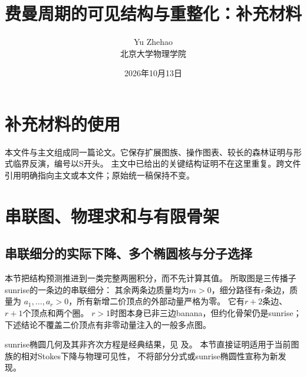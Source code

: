 \documentclass[11pt,a4paper,oneside]{ctexart}
\title{费曼周期的可见结构与重整化：补充材料}
\author{Yu Zhehao\\[4pt]\small 北京大学物理学院}\date{2026年10月13日}
\theoremstyle{cnplain}
\theoremstyle{definition}
\theoremstyle{remark}
\newcommand{\Q}{\mathbb Q}
\newcommand{\im}{\operatorname{im}}
\newcommand{\dR}{\mathrm{dR}}
\numberwithin{equation}{section}
\begin{document}
\maketitle\tableofcontents
\section*{补充材料的使用}
本文件与主文组成同一篇论文。它保存扩展图族、操作图表、较长的森林证明与形式临界反演，编号以S开头。
主文中已给出的关键结构证明不在这里重复。跨文件引用明确指向主文或本文件；原始统一稿保持不变。

\section{串联图、物理求和与有限骨架}\label{supp:unified}

\begingroup
\providecommand{\Q}{\mathbb Q}\providecommand{\cC}{\mathcal C}
\providecommand{\cS}{\mathcal S}\providecommand{\dR}{\mathrm{dR}}
\providecommand{\rk}{\operatorname{rk}}\providecommand{\im}{\operatorname{im}}
\subsection{串联细分的实际下降、多个椭圆核与分子选择}
\label{unified:sec:serieselliptic}
本节把结构预测推进到一类完整两圈积分，而不先计算其值。
所取图是三传播子sunrise的一条边的串联细分：
其余两条边质量均为$m>0$，细分路径有$r$条边，质量为
$a_1,\ldots,a_r>0$，所有新增二价顶点的外部动量严格为零。
它有$r+2$条边、$r+1$个顶点和两个圈。
$r>1$时图本身已非三边banana，但约化骨架仍是sunrise；
下述结论不覆盖二价顶点有非零动量注入的一般多点图。

sunrise椭圆几何及其非齐次方程是经典结果，见
\cite[\S4--5]{abwsun}及\cite[\S3--4]{bkvsunset}。
本节直接证明适用于当前图族的相对Stokes下降与物理可见性，
不将部分分式或sunrise椭圆性宣称为新发现。
\end{document}
